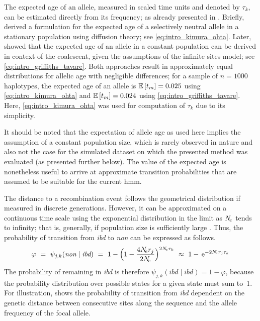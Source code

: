 The expected age of an allele, measured in scaled time units and denoted by $\tau_k$, can be estimated directly from its frequency; as already presented in .
Briefly, \citet{Kimura:1973ug} derived a formulation for the expected age of a selectively neutral allele in a stationary population using diffusion theory; see \cref{eq:intro_kimura_ohta}.
Later, \citet{Griffiths:2013ec} showed that the expected age of an allele in a constant population can be derived in context of the coalescent, given the assumptions of the infinite sites model; see \cref{eq:intro_griffiths_tavare}.
Both approaches result in approximately equal distributions for allelic age
with negligible differences; \eg for a sample of ${n=\num{1000}}$ haplotypes, the expected age of an  allele is
${\mathbb{E}\left[t_m\right]=\dec{0.02490825}}$ using \cref{eq:intro_kimura_ohta} and
${\mathbb{E}\left[t_m\right]=\dec{0.02398986}}$ using \cref{eq:intro_griffiths_tavare}.
Here, \cref{eq:intro_kimura_ohta} was used for computation of $\tau_k$ due to its simplicity.

It should be noted that the expectation of allele age as used here implies the assumption of a constant population size, which is rarely observed in nature and also not the case for the simulated dataset on which the presented method was evaluated (as presented further below).
The value of the expected age is nonetheless useful to arrive at approximate transition probabilities that are assumed to be suitable for the current \gls{hmm}.

The distance to a recombination event follows the geometrical distribution if measured in discrete generations.
However, it can be approximated on a continuous time scale using the exponential distribution in the limit as $N_{\!e}$ tends to infinity; that is, generally, if population size is sufficiently large \citep[see][]{hein2004gene}.
Thus, the probability of transition from \emph{ibd} to \emph{non} can be expressed as follows.
\begin{equation}\label{eq:hmm_trans_prob}
	\varphi ~=~ \psi_{j,k}(\textit{non}\mid\textit{ibd}) ~=~
	1 - \Big( 1 - \frac{4N_{\!e} r_j}{2N_{\!e}} \Big)^{2N_{\!e}\tau_k} ~\approx~
	1 - \,\mathrm{e}^{-2N_{\!e} r_j \tau_k}
\end{equation}
The probability of remaining in \emph{ibd} is therefore ${\psi_{j,k}(\textit{ibd}\mid\textit{ibd}) = 1-\varphi}$, because the probability distribution over possible states for a given state must sum to~1.
For illustration,  shows the probability of transition from \emph{ibd} dependent on the genetic distance between consecutive sites along the sequence and the allele frequency of the focal allele.

